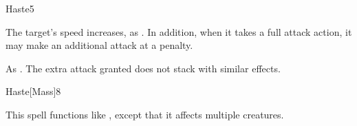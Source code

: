 \begin{spellsection}{Haste}{5}
    \begin{spellheader}
    \end{spellheader}
    \begin{spellcontent}
        \begin{spelltargetinginfo}
        \end{spelltargetinginfo}
        \begin{spelleffects}
            \spelleffect The target's speed increases, as . In addition, when it takes a full attack action, it may make an additional attack at a  penalty.
            \spelldur \durshort
        \end{spelleffects}
    \end{spellcontent}
    \begin{spellfooter}
        \spellnotes As . The extra attack granted does not stack with similar effects.
        \miscastrandom
    \end{spellfooter}
\end{spellsection}

\begin{spellsection}{Haste}[Mass]{8}
    \begin{spellheader}
    \end{spellheader}
    \begin{spellcontent}
        \begin{spelltargetinginfo}
        \end{spelltargetinginfo}
        \begin{spelleffects}
            \spellspecial This spell functions like , except that it affects multiple creatures.
        \end{spelleffects}
    \end{spellcontent}
    \begin{spellfooter}
        \miscastexplode
    \end{spellfooter}
\end{spellsection}

